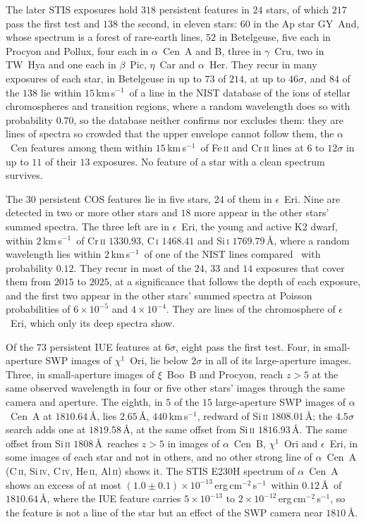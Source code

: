 \documentclass[3p,11pt]{elsarticle}
\newcommand{\kms}{km\,s$^{-1}$}
\newcommand{\flux}{erg\,cm$^{-2}$\,s$^{-1}$}
\newcommand{\sci}[2]{#1\times10^{#2}}
\newcommand{\ion}[2]{#1\,\textsc{#2}}
\begin{document}
The later STIS exposures hold $318$ persistent features in $24$ stars, of which $217$
pass the first test and $138$ the second, in eleven stars: $60$ in the Ap star GY~And,
whose spectrum is a forest of rare-earth lines, $52$ in Betelgeuse, five each in Procyon
and Pollux, four each in $\alpha$~Cen~A and B, three in $\gamma$~Cru, two in TW~Hya and
one each in $\beta$~Pic, $\eta$~Car and $\alpha$~Her. They recur in many exposures of
each star, in Betelgeuse in up to $73$ of $214$, at up to $46\sigma$, and $84$ of the
$138$ lie within $15$\,\kms\ of a line in the NIST database of the ions of stellar
chromospheres and transition regions, where a random wavelength does so with probability
$0.70$, so the database neither confirms nor excludes them: they are lines of spectra so
crowded that the upper envelope cannot follow them, the $\alpha$~Cen features among them
within $15$\,\kms\ of \ion{Fe}{ii} and \ion{Cr}{ii} lines at $6$ to $12\sigma$ in up to
$11$ of their $13$ exposures. No feature of a star with a clean spectrum survives.

The $30$ persistent COS features lie in five stars, $24$ of them in
$\epsilon$~Eri. Nine are detected in two or more other stars and $18$ more appear in the
other stars' summed spectra. The three left are in $\epsilon$~Eri, the young and active
K2 dwarf, within $2$\,\kms\ of \ion{Cr}{ii} $1330.93$, \ion{C}{i} $1468.41$ and
\ion{Si}{i} $1769.79$\,\AA, where a random wavelength lies within $2$\,\kms\ of one of
the NIST lines compared~\cite{NIST} with probability $0.12$. They recur in most of the
$24$, $33$ and $14$ exposures that cover them from $2015$ to $2025$, at a significance
that follows the depth of each exposure, and the first two appear in the other stars'
summed spectra at Poisson probabilities of $\sci{6}{-5}$ and $\sci{4}{-4}$. They are
lines of the chromosphere of $\epsilon$~Eri, which only its deep spectra show.

Of the $73$ persistent IUE features at $6\sigma$, eight pass the first test. Four,
in small-aperture SWP images of $\chi^1$~Ori, lie below $2\sigma$ in all of its
large-aperture images. Three, in small-aperture images of $\xi$~Boo~B and Procyon, reach
$z>5$ at the same observed wavelength in four or five other stars' images through the
same camera and aperture. The eighth, in $5$ of the $15$ large-aperture SWP
images of $\alpha$~Cen~A at $1810.64$\,\AA, lies $2.65$\,\AA, $440$\,\kms, redward of
\ion{Si}{ii} $1808.01$\,\AA; the $4.5\sigma$ search adds one at $1819.58$\,\AA, at the
same offset from \ion{Si}{ii} $1816.93$\,\AA. The same offset from \ion{Si}{ii}
$1808$\,\AA\ reaches $z>5$ in images of $\alpha$~Cen~B, $\chi^1$~Ori and
$\epsilon$~Eri, in some images of each star and not in others, and no other strong line
of $\alpha$~Cen~A (\ion{C}{ii}, \ion{Si}{iv}, \ion{C}{iv}, \ion{He}{ii}, \ion{Al}{ii})
shows it. The STIS E230H spectrum of $\alpha$~Cen~A shows an excess of at most
$(1.0\pm0.1)\times10^{-13}$\,\flux\ within $0.12$\,\AA\ of $1810.64$\,\AA, where the IUE
feature carries $\sci{5}{-13}$ to $\sci{2}{-12}$\,\flux, so the feature is not a line of
the star but an effect of the SWP camera near $1810$\,\AA.
\end{document}
